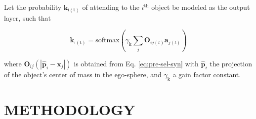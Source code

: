 \documentclass[letterpaper, 10 pt, conference]{ieeeconf}  %
\begin{document}
	Let the probability $\mathbf{k}_\mathrm{i(t)}$ of attending to the $i^\mathrm{th}$ object be modeled as the output layer, such that
	
	\begin{equation}
	\mathbf{k}_\mathrm{i(t)} = \mathrm{softmax}\left(\gamma_{\mathrm{k}}\sum_{j}^{} \mathbf{O}_{ij(t)}\mathbf{a}_{j(t)}\right)
	\label{eq:out}
	\end{equation}
	
	\noindent where $\mathbf{O}_{ij}(|\mathbf{\hat{p}}_i-\mathbf{x}_j|)$ is obtained from Eq. \eqref{eq:pre-sel-syn} with $\mathbf{\hat{p}}_i$ the projection of the object's center of mass in the ego-sphere, and $\gamma_{\mathrm{k}}$ a gain factor constant.
	


	

%	
%			
%	
	
	\section{METHODOLOGY}
	\label{sec:methodology}
\end{document}
